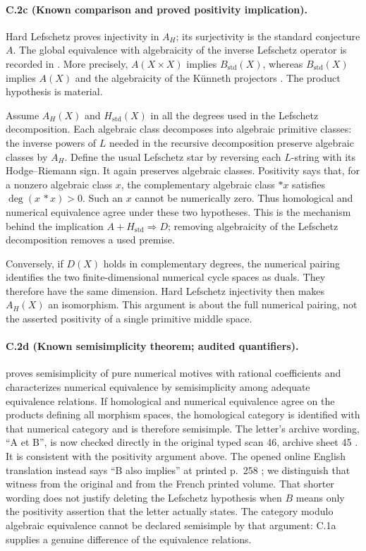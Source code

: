\paragraph{C.2c (Known comparison and proved positivity implication).}
Hard Lefschetz proves injectivity in $A_H$; its surjectivity is the
standard conjecture $A$. The global equivalence with algebraicity of
the inverse Lefschetz operator is recorded in
\citet[Corollary 2.14]{cyKleiman1968}. More precisely,
$A(X\times X)$ implies $B_{\mathrm{std}}(X)$, whereas
$B_{\mathrm{std}}(X)$ implies $A(X)$ and the algebraicity of the
K\"unneth projectors
\citep[Theorem 4-1]{cyKleiman1994}. The product hypothesis is material.

Assume $A_H(X)$ and $H_{\mathrm{std}}(X)$ in all the degrees used in the
Lefschetz decomposition. Each algebraic class decomposes into algebraic
primitive classes: the inverse powers of $L$ needed in the recursive
decomposition preserve algebraic classes by $A_H$. Define the usual
Lefschetz star by reversing each $L$-string with its Hodge--Riemann sign.
It again preserves algebraic classes. Positivity says that, for a
nonzero algebraic class $x$, the complementary algebraic class $*x$
satisfies $\deg(x\,*x)>0$. Such an $x$ cannot be numerically zero.
Thus homological and numerical equivalence agree under these two
hypotheses. This is the mechanism behind the implication
$A+H_{\mathrm{std}}\Rightarrow D$; removing algebraicity of the
Lefschetz decomposition removes a used premise.

Conversely, if $D(X)$ holds in complementary degrees, the numerical
pairing identifies the two finite-dimensional numerical cycle spaces
as duals. They therefore have the same dimension. Hard Lefschetz
injectivity then makes $A_H(X)$ an isomorphism. This argument is about
the full numerical pairing, not the asserted positivity of a single
primitive middle space.

\paragraph{C.2d (Known semisimplicity theorem; audited quantifiers).}
\citet[Theorem 1]{Jannsen1992} proves semisimplicity of pure numerical
motives with rational coefficients and characterizes numerical
equivalence by semisimplicity among adequate equivalence relations.
If homological and numerical equivalence agree on the products defining
all morphism spaces, the homological category is identified with that
numerical category and is therefore semisimple. The letter's archive
wording, ``A et B'', is now checked directly in the original typed
scan 46, archive sheet 45
\citep[scan 46]{GrothendieckCote14Scan}. It is consistent with the
positivity argument above. The opened online English translation
instead says ``B also implies'' at printed p.~258
\citep[p.~258]{rootGrothendieckSerreEnglish}; we distinguish that
witness from the original and from the French printed volume.
That shorter wording does not justify deleting the
Lefschetz hypothesis when $B$ means only the positivity assertion that
the letter actually states. The category modulo algebraic equivalence
cannot be declared semisimple by that argument: C.1a supplies a genuine
difference of the equivalence relations.

